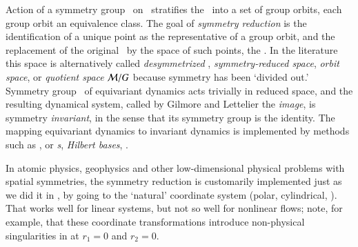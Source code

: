 
Action of a symmetry group \Group\ on \pS\ stratifies
the \statesp\ into a set of group orbits,
 each group orbit an
equivalence class. The goal of {\em symmetry reduction} is the
identification of a unique point as the
representative of a group orbit, and the replacement
of the original \statesp\ by
the space of such points, the {\em \reducedsp}.
In the literature this space is alternatively called
\emph{desymmetrized \statesp},
\emph{symmetry-reduced space},
\emph{orbit space}, or \emph{quotient space}
${\cal M}/G$ because symmetry has been `divided out.'
Symmetry group \Group\ of equivariant dynamics acts trivially
in reduced space, and the resulting dynamical system, called
by Gilmore and Lettelier the \emph{image}, is
symmetry {\em invariant}, in the sense that its symmetry group is
the identity.
The mapping equivariant dynamics to invariant dynamics is
implemented
by methods such as
{\em \mframes},
{\em \mslices} or {\em \csection s},
{\em Hilbert bases},
\etc.
%

In atomic physics, geophysics and other
low-dimensional physical problems with spatial symmetries,
the symmetry reduction is customarily implemented just as we
did it in , by going to the `natural'
coordinate system (polar, cylindrical, \etc). That works well
for linear systems, but not so well for nonlinear flows;
note, for example, that these coordinate transformations
introduce non-physical singularities
in at $r_1=0$ and $r_2=0$.

